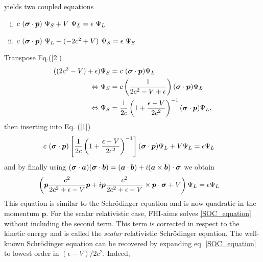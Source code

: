 yields two coupled equations 
	\begin{enumerate}[(i)]
		\item $c ~(\boldsymbol{\sigma} \cdot \boldsymbol{p}) ~\Psi_S + V~\Psi_L = \epsilon~\Psi_L	$ \label{1}
		\item $c ~(\boldsymbol{\sigma} \cdot \boldsymbol{p}) ~\Psi_L + (-2c^2+V)~\Psi_S = \epsilon~\Psi_S$ \label{2}
	\end{enumerate}
Transpose Eq.(\ref{2})
	\begin{align}
		((2c^2 - V) + \epsilon) \Psi_S &= c~(\boldsymbol{\sigma} \cdot \boldsymbol{p})\Psi_L	\\
		\Leftrightarrow
		\Psi_S &= c 
		\left(
			\frac{1}{2c^2 - V + \epsilon} 
		\right) 
		(\boldsymbol{\sigma} \cdot \boldsymbol{p})\Psi_L \\
		\Leftrightarrow
		\Psi_S &= \frac{1}{2c}
		\left(
		{1 + \frac{\epsilon - V}{2c^2}} 
		\right)^{-1} 
		(\boldsymbol{\sigma} \cdot \boldsymbol{p})\Psi_L,
	\end{align}
then inserting into Eq. (\ref{1})
	\begin{align}
		c ~(\boldsymbol{\sigma} \cdot \boldsymbol{p})
		\left[
			\frac{1}{2c}
			\left(
			{1 + \frac{\epsilon - V}{2c^2}} 
			\right)^{-1}
		\right]		
		(\boldsymbol{\sigma} \cdot \boldsymbol{p})\Psi_L
		+ V \Psi_L 
		&= \epsilon \Psi_L
	\end{align}
and by finally using $(\boldsymbol{\sigma} \cdot \boldsymbol{a})(\boldsymbol{\sigma} \cdot \boldsymbol{b}) =  (\boldsymbol{a} \cdot \boldsymbol{b}) + i (\boldsymbol{a} \times \boldsymbol{b}) \cdot \boldsymbol{\sigma} $ 
we obtain
	\begin{align} \label{SOC_equation}
		\left(
			\boldsymbol{p} \frac{c^2}{2c^2 + \epsilon - V} \boldsymbol{p} 
			+ i \boldsymbol{p} \frac{c^2}{2c^2 + \epsilon - V} \times \boldsymbol{p} \cdot \boldsymbol{\sigma} 
			+ V 
		\right) \Psi_L 
		&= \epsilon \Psi_L	
	\end{align}
	This equation is similar to the Schrödinger equation and is now quadratic in the momentum $\boldsymbol p$. For the scalar relativistic case, FHI-aims solves \eqref{SOC_equation} without including the second term. This term is corrected in respect to the kinetic energy and is called the \textit{scalar} relativistic Schrödinger equation. 
	The well-known Schrödinger equation can be recovered by expanding eq. \eqref{SOC_equation} to lowest order in $(\epsilon - V)/2c^2$. Indeed,
